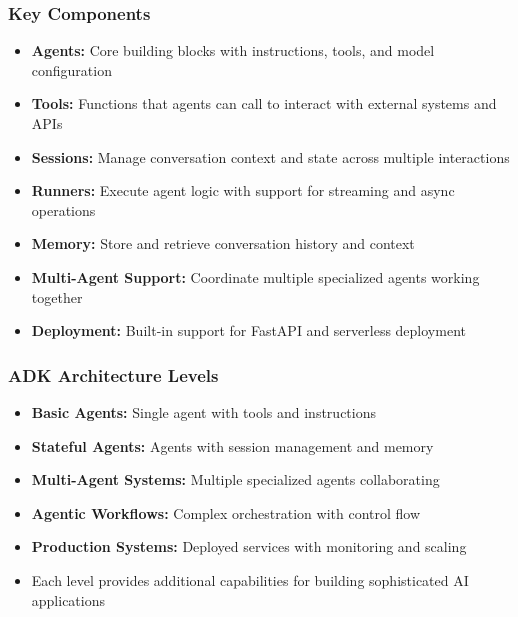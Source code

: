 \begin{frame}[fragile]\frametitle{Key Components}

    \begin{itemize}
	\item \textbf{Agents:} Core building blocks with instructions, tools, and model configuration
	\item \textbf{Tools:} Functions that agents can call to interact with external systems and APIs
	\item \textbf{Sessions:} Manage conversation context and state across multiple interactions
	\item \textbf{Runners:} Execute agent logic with support for streaming and async operations
	\item \textbf{Memory:} Store and retrieve conversation history and context
	\item \textbf{Multi-Agent Support:} Coordinate multiple specialized agents working together
	\item \textbf{Deployment:} Built-in support for FastAPI and serverless deployment
	  \end{itemize}
\end{frame}

\begin{frame}[fragile]\frametitle{ADK Architecture Levels}
      \begin{itemize}
	\item \textbf{Basic Agents:} Single agent with tools and instructions
	\item \textbf{Stateful Agents:} Agents with session management and memory
	\item \textbf{Multi-Agent Systems:} Multiple specialized agents collaborating
	\item \textbf{Agentic Workflows:} Complex orchestration with control flow
	\item \textbf{Production Systems:} Deployed services with monitoring and scaling
	\item Each level provides additional capabilities for building sophisticated AI applications
	  \end{itemize}
\end{frame}

